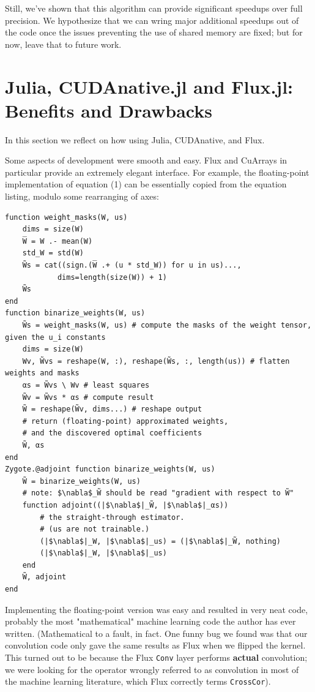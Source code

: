 \documentclass[12pt]{article}
\begin{document}
Still, we've shown that this algorithm can provide significant speedups over full precision. We hypothesize that we can wring major additional speedups out of the code once the issues preventing the use of shared memory are fixed; but for now, leave that to future work.

\section{Julia, CUDAnative.jl and Flux.jl: Benefits and Drawbacks}
\label{sec:org2243b63}
In this section we reflect on how using Julia, CUDAnative, and Flux.

Some aspects of development were smooth and easy. Flux and CuArrays in particular provide an extremely elegant interface. For example, the floating-point implementation of equation (1) can be essentially copied from the equation listing, modulo some rearranging of axes:
\begin{verbatim}
function weight_masks(W, us)
    dims = size(W)
    W̅ = W .- mean(W)
    std_W = std(W)
    W̃s = cat((sign.(W̅ .+ (u * std_W)) for u in us)...,
            dims=length(size(W)) + 1)
    W̃s
end
function binarize_weights(W, us)
    W̃s = weight_masks(W, us) # compute the masks of the weight tensor, given the u_i constants
    dims = size(W)
    Wv, W̃vs = reshape(W, :), reshape(W̃s, :, length(us)) # flatten weights and masks
    αs = W̃vs \ Wv # least squares
    W̃v = W̃vs * αs # compute result
    W̃ = reshape(W̃v, dims...) # reshape output
    # return (floating-point) approximated weights,
    # and the discovered optimal coefficients
    W̃, αs
end
Zygote.@adjoint function binarize_weights(W, us)
    W̃ = binarize_weights(W, us)
    # note: $\nabla$_W̃ should be read "gradient with respect to W̃"
    function adjoint((|$\nabla$|_W̃, |$\nabla$|_αs))
        # the straight-through estimator.
        # (us are not trainable.)
        (|$\nabla$|_W, |$\nabla$|_us) = (|$\nabla$|_W̃, nothing)
        (|$\nabla$|_W, |$\nabla$|_us)
    end
    W̃, adjoint
end
\end{verbatim}

Implementing the floating-point version was easy and resulted in very neat code, probably the most "mathematical" machine learning code the author has ever written. (Mathematical to a fault, in fact. One funny bug we found was that our convolution code only gave the same results as Flux when we flipped the kernel. This turned out to be because the Flux \texttt{Conv} layer performs \textbf{actual} convolution; we were looking for the operator wrongly referred to as convolution in most of the machine learning literature, which Flux correctly terms \texttt{CrossCor}).
\end{document}
